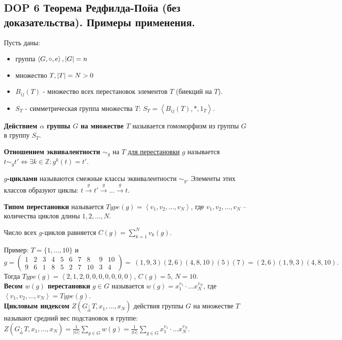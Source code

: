 \subsection*{DOP 6 Теорема Редфилда-Пойа (без доказательства). Примеры применения.}

Пусть даны:
\begin{itemize}
    \item группа $\left< G, \circ, e \right>, \space |G| = n$
    \item множество $T, \space |T| = N>0$
    \item $B_{ij}(T)$ - множество всех перестановок элементов $T$ (биекций на $T$).
    \item $S_{T}$ - симметрическая группа множества $T$: $S_{T} = \left< B_{ij}(T), *, 1_{T} \right>$.
\end{itemize}

\textbf{Действием $\alpha$ группы $G$ на множестве $T$} называется гомоморфизм из группы $G$ в группу $S_{T}$.

\textbf{Отношением эквивалентности} $\sim_{g}$ на $T$ \underline{для перестановки} $g$ называется $t \sim_{g} t' \Leftrightarrow \exists k \in \mathbb{Z}: g^k(t) = t'$.

\textbf{$g$-циклами} называются смежные классы эквивалентности $\sim_{g}$. Элементы этих классов образуют циклы:
$t \overset{g}{\to} t' \overset{g}{\to} \ldots \overset{g}{\to} t$.

\textbf{Типом перестановки} называется $Type(g) = \left< v_{1}, v_{2}, \dots, v_{N} \right>$,
где $v_{1}, v_{2}, \dots, v_{N}$ -- количества циклов длины $1, 2, \dots, N$.

Число всех $g$-циклов равняется $C(g) = \sum\limits_{k=1}^{N} v_{k}(g)$.

Пример: $T = \{1, \dots, 10\}$ и
$$g = \begin{pmatrix} 1&2&3&4&5&6&7&8&9&10 \\ 9&6&1&8&5&2&7&10&3&4 \end{pmatrix} = \
(1,9,3)(2,6)(4,8,10)(5)(7) = (2,6)(1,9,3)(4,8,10).$$
Тогда $Type(g) = \left< 2, 1, 2, 0, 0, 0, 0, 0, 0, 0 \right>$, $C(g) = 5$, $N = 10$.\\

\textbf{Весом $w(g)$ перестановки} $g \in G$ называется $w(g) = x_{1}^{v_{1}} \cdot \dots x_{N}^{v_{N}}$, где $\left< v_{1}, v_{2}, \dots, v_{N} \right> = Type(g)$.\\

\textbf{Цикловым индексом} $Z(G \underset{\alpha}{:}T, x_{1}, \dots, x_{N})$ действия группы $G$ на множестве $T$ называют средний вес подстановок в группе: $Z(G \underset{\alpha}{:}T, x_{1}, \dots, x_{N}) = \frac{1}{|G|} \sum\limits_{g \in G} w(g) = \frac{1}{|G|} \sum\limits_{g \in G} x_{1}^{v_{1}} \cdot \dots x_{N}^{v_{N}}$.\\


